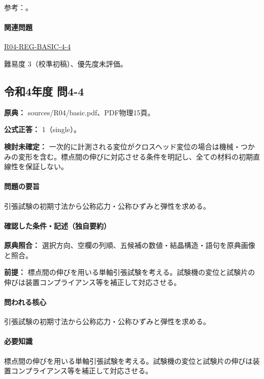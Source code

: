 \par 参考：\cite{mit_material_stressstrain2001,mit_material_elastic2000}。

\paragraph{関連問題} \hyperref[q:r04-reg-basic-4-4]{R04-REG-BASIC-4-4}

\par 難易度 3（校準初稿）、優先度未評価。

\subsection{令和4年度 問4-4}
\label{q:r04-reg-basic-4-4}

\noindent\textbf{原典：} sources/R04/basic.pdf、PDF物理15頁。

\textbf{公式正答：} 1（single）。

\par\textbf{検討未確定：} 一次的に計測される変位がクロスヘッド変位の場合は機械・つかみの変形を含む。標点間の伸びに対応させる条件を明記し、全ての材料の初期直線性を保証しない。

\paragraph{問題の要旨} 引張試験の初期寸法から公称応力・公称ひずみと弾性を求める。

\paragraph{確認した条件・記述（独自要約）}\mbox{}\par

\noindent\textbf{原典照合：} 選択方向、空欄の列順、五候補の数値・結晶構造・語句を原典画像と照合。\par

\noindent\textbf{前提：} 標点間の伸びを用いる単軸引張試験を考える。試験機の変位と試験片の伸びは装置コンプライアンス等を補正して対応させる。\par

\paragraph{問われる核心} 引張試験の初期寸法から公称応力・公称ひずみと弾性を求める。

\paragraph{必要知識} 標点間の伸びを用いる単軸引張試験を考える。試験機の変位と試験片の伸びは装置コンプライアンス等を補正して対応させる。

